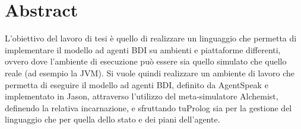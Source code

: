 \chapter*{Abstract} %



L'obiettivo del lavoro di tesi è quello di realizzare un linguaggio che permetta di implementare il modello ad agenti BDI su ambienti e piattaforme differenti, ovvero dove l'ambiente di esecuzione può essere sia quello simulato che quello reale (ad esempio la JVM). Si vuole quindi realizzare un ambiente di lavoro che permetta di eseguire il modello ad agenti BDI, definito da AgentSpeak e implementato in Jason, attraverso l'utilizzo del meta-simulatore Alchemist, definendo la relativa incarnazione, e sfruttando tuProlog sia per la gestione del linguaggio che per quella dello stato e dei piani dell'agente.

\clearpage{\pagestyle{empty}\cleardoublepage}

\tableofcontents

\rhead[\fancyplain{}{\bfseries\leftmark}]{\fancyplain{}{\bfseries\thepage}}

\clearpage{\pagestyle{empty}\cleardoublepage}

\listoffigures

\clearpage{\pagestyle{empty}\cleardoublepage}


\clearpage{\pagestyle{empty}\cleardoublepage}

\lstlistoflistings

\clearpage{\pagestyle{empty}\cleardoublepage}
